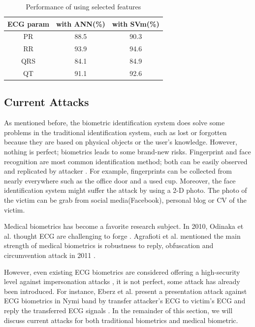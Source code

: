 \documentclass[a4paper,12pt]{article}
\begin{document}
\begin{table}[H]
    \centering
    \begin{tabular}{c|c|c}
         ECG param& with ANN(\%) & with SVm(\%) \\
    \hline
         PR & 88.5 & 90.3 \\
         RR & 93.9 & 94.6 \\
         QRS & 84.1 & 84.9 \\
         QT & 91.1 & 92.6 
    \end{tabular}
    \caption{Performance of using selected features \autocite{Banerjee:2013estimation}}
    \label{tab:perfoemance_ppges}
\end{table}

\subsection{Current Attacks}
As mentioned before, the biometric identification system does solve some problems in the traditional identification system, such as lost or forgotten because they are based on physical objects or the user's knowledge. However, nothing is perfect; biometrics leads to some brand-new risks. Fingerprint and face recognition are most common identification method; both can be easily observed and replicated by attacker \autocite{Eberz:2018your}. For example, fingerprints can be collected from nearly everywhere such as the office door and a used cup. Moreover, the face identification system might suffer the attack by using a 2-D photo. The photo of the victim can be grab from social media(Facebook), personal blog or CV of the victim.

Medical biometrics has become a favorite research subject. In 2010, Odinaka et al. thought ECG are challenging to forge \autocite{Odinaka:2010ecg}. Agrafioti et al. mentioned the main strength of medical biometrics is robustness to reply, obfuscation and circumvention attack in 2011 \autocite{Agrafioti:2011heart}.

However, even existing ECG biometrics are considered offering a high-security level against impersonation attacks \autocite{Blasco:2018feasibility}, it is not perfect, some attack has already been introduced. For instance, Eberz et al. present a presentation attack against ECG biometrics in Nymi band by transfer attacker's ECG to victim's ECG and reply the transferred ECG signals \autocite{Eberz:2017broken}. In the remainder of this section, we will discuss current attacks for both traditional biometrics and medical biometric.
\end{document}
